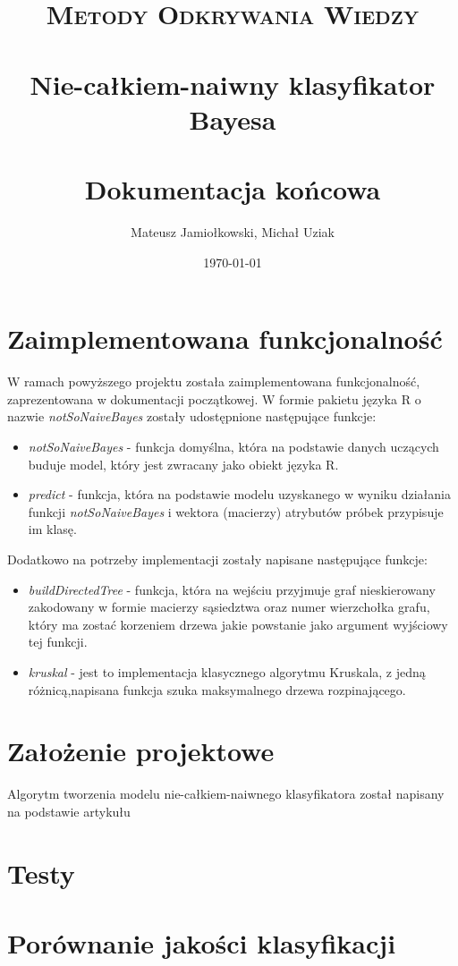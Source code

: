 \documentclass[paper=a4, fontsize=11pt]{scrartcl} %
\title{	
\normalfont \normalsize 
\textsc{Metody Odkrywania Wiedzy} \\ [25pt] %
\horrule{0.5pt} \\[0.4cm] %
\huge Nie-całkiem-naiwny klasyfikator Bayesa \\ %
\horrule{2pt} \\[0.5cm] %
\LARGE Dokumentacja końcowa
}%
\author{Mateusz Jamiołkowski, Michał Uziak} %
\date{\normalsize\today} %
\numberwithin{equation}{section} %
\numberwithin{figure}{section} %
\numberwithin{table}{section} %
\begin{document}
\maketitle %

\section{Zaimplementowana funkcjonalność}
W ramach powyższego  projektu została zaimplementowana funkcjonalność, zaprezentowana w dokumentacji początkowej.
W formie pakietu  języka R o nazwie \textit{notSoNaiveBayes} zostały udostępnione następujące funkcje:
\begin{itemize}
 \item \textit{notSoNaiveBayes} - funkcja domyślna, która na podstawie danych uczących buduje model, który jest zwracany jako obiekt języka R.
 \item \textit{predict} - funkcja, która na podstawie modelu uzyskanego w wyniku działania funkcji \textit{notSoNaiveBayes} i wektora (macierzy) atrybutów próbek przypisuje im klasę.
\end{itemize}

Dodatkowo na potrzeby implementacji zostały napisane następujące funkcje:
\begin{itemize}
 \item \textit{buildDirectedTree} - funkcja, która na wejściu przyjmuje graf nieskierowany zakodowany w formie macierzy sąsiedztwa oraz numer wierzchołka grafu, który ma zostać korzeniem drzewa jakie powstanie jako argument wyjściowy tej funkcji.
 \item \textit{kruskal} - jest to implementacja klasycznego algorytmu Kruskala, z jedną różnicą,napisana funkcja szuka maksymalnego drzewa rozpinającego.
\end{itemize}

\section{Założenie projektowe}
Algorytm tworzenia modelu nie-całkiem-naiwnego klasyfikatora został napisany na podstawie artykułu \cite{Bayesian_Network_Classifiers}

\section{Testy}
\section{Porównanie jakości klasyfikacji }






 
\end{document}
